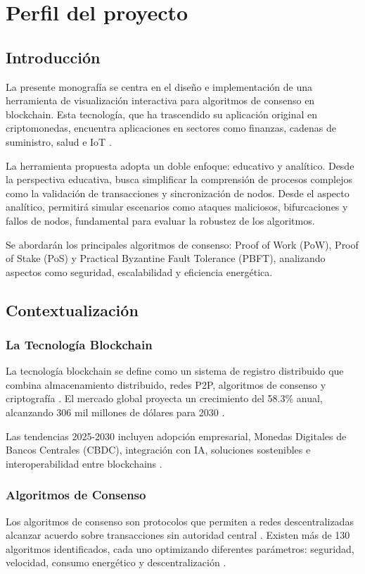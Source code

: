 \documentclass[spanish,12pt,letterpaper]{report}
\begin{document}
\doublespacing
\tableofcontents
\newpage

\chapter{Perfil del proyecto}
\section{Introducción}
La presente monografía se centra en el diseño e implementación de una herramienta de visualización interactiva para algoritmos de consenso en blockchain. Esta tecnología, que ha trascendido su aplicación original en criptomonedas, encuentra aplicaciones en sectores como finanzas, cadenas de suministro, salud e IoT \parencite{businesswire2025blockchain}.

La herramienta propuesta adopta un doble enfoque: educativo y analítico. Desde la perspectiva educativa, busca simplificar la comprensión de procesos complejos como la validación de transacciones y sincronización de nodos. Desde el aspecto analítico, permitirá simular escenarios como ataques maliciosos, bifurcaciones y fallos de nodos, fundamental para evaluar la robustez de los algoritmos.

Se abordarán los principales algoritmos de consenso: Proof of Work (PoW), Proof of Stake (PoS) y Practical Byzantine Fault Tolerance (PBFT), analizando aspectos como seguridad, escalabilidad y eficiencia energética.

\section{Contextualización}
\subsection{La Tecnología Blockchain}
La tecnología blockchain se define como un sistema de registro distribuido que combina almacenamiento distribuido, redes P2P, algoritmos de consenso y criptografía \parencite{odu20255g}. El mercado global proyecta un crecimiento del 58.3\% anual, alcanzando 306 mil millones de dólares para 2030 \parencite{businesswire2025blockchain}.

Las tendencias 2025-2030 incluyen adopción empresarial, Monedas Digitales de Bancos Centrales (CBDC), integración con IA, soluciones sostenibles e interoperabilidad entre blockchains \parencite{charterglobal2025top}.

\subsection{Algoritmos de Consenso}
Los algoritmos de consenso son protocolos que permiten a redes descentralizadas alcanzar acuerdo sobre transacciones sin autoridad central \parencite{visa2025what}. Existen más de 130 algoritmos identificados, cada uno optimizando diferentes parámetros: seguridad, velocidad, consumo energético y descentralización \parencite{researchgate2025systematic}.
\end{document}
